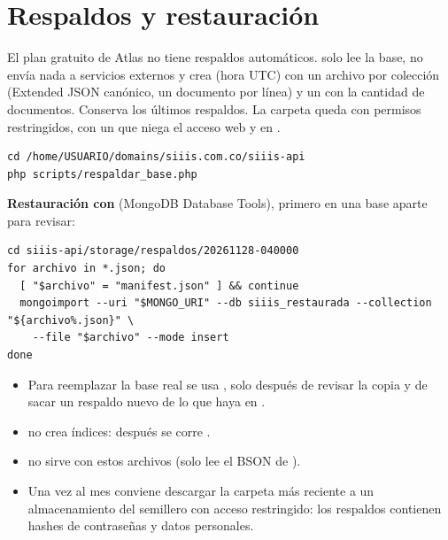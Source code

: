 \documentclass[11pt,a4paper]{article}
\begin{document}

\section{Respaldos y restauraci\'on}\label{sec:respaldos}

El plan gratuito de Atlas no tiene respaldos autom\'aticos.  solo lee la base, no env\'ia
nada a servicios externos y crea  (hora UTC) con un archivo 
por colecci\'on (Extended JSON can\'onico, un documento por l\'inea) y un  con la cantidad de
documentos. Conserva los \'ultimos  respaldos. La carpeta queda con permisos restringidos, con un
 que niega el acceso web y en .

\begin{lstlisting}[style=bash]
cd /home/USUARIO/domains/siiis.com.co/siiis-api
php scripts/respaldar_base.php
\end{lstlisting}

\textbf{Restauraci\'on con } (MongoDB Database Tools), primero en una base aparte para revisar:
\begin{lstlisting}[style=bash]
cd siiis-api/storage/respaldos/20261128-040000
for archivo in *.json; do
  [ "$archivo" = "manifest.json" ] && continue
  mongoimport --uri "$MONGO_URI" --db siiis_restaurada --collection "${archivo%.json}" \
    --file "$archivo" --mode insert
done
\end{lstlisting}
\begin{itemize}
  \item Para reemplazar la base real se usa , solo despu\'es de revisar la copia y de sacar un
    respaldo nuevo de lo que haya en .
  \item {} no crea \'indices: despu\'es se corre .
  \item {} no sirve con estos archivos (solo lee el BSON de ).
  \item Una vez al mes conviene descargar la carpeta m\'as reciente a un almacenamiento del semillero con acceso
    restringido: los respaldos contienen hashes de contrase\~nas y datos personales.
\end{itemize}
\end{document}
